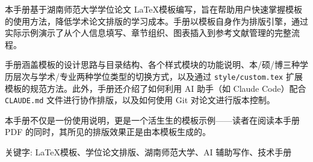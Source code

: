 \documentclass[../main-manual.tex]{subfiles}
\begin{document}
\renewcommand{\baselinestretch}{1.5}
\pagestyle{fancy}
\fancyhead{}
\renewcommand{\headrulewidth}{1.5pt}
\renewcommand{\footrulewidth}{0pt}


\begin{cnabstract}
	{
本手册基于湖南师范大学学位论文 \LaTeX 模板编写，旨在帮助用户快速掌握模板的使用方法，降低学术论文排版的学习成本。手册以模板自身作为排版引擎，通过实际示例演示了从个人信息填写、章节组织、图表插入到参考文献管理的完整流程。

手册涵盖模板的设计思路与目录结构、各个样式模块的功能说明、本/硕/博三种学历层次与学术/专业两种学位类型的切换方式，以及通过 \texttt{style/custom.tex} 扩展模板的规范方法。此外，手册还介绍了如何利用 AI 助手（如 Claude Code）配合 \texttt{CLAUDE.md} 文件进行协作排版，以及如何使用 Git 对论文进行版本控制。

本手册不仅是一份使用说明，更是一个活生生的模板示例——读者在阅读本手册 PDF 的同时，其所见的排版效果正是由本模板生成的。

		\vspace{0.5cm}
		\par {\heiti {} 关键字: \LaTeX 模板、学位论文排版、湖南师范大学、AI 辅助写作、技术手册}
	}
\end{cnabstract}

\cleardoublepage

\end{document}
